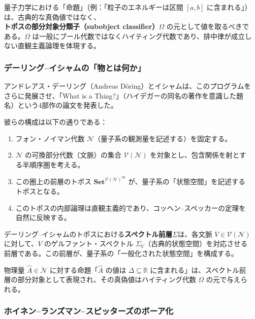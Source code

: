 \documentclass[12pt,a4paper]{ltjsarticle}
\theoremstyle{definition}
\newcommand{\Set}{\mathbf{Set}}
\begin{document}
\begin{keyinsight}
量子力学における「命題」（例：「粒子のエネルギーは区間 $[a,b]$ に含まれる」）は、古典的な真偽値ではなく、\textbf{トポスの部分対象分類子（subobject classifier）}$\Omega$ の元として値を取るべきである。$\Omega$ は一般にブール代数ではなくハイティング代数であり、排中律が成立しない直観主義論理を体現する。
\end{keyinsight}

\subsubsection{デーリング--イシャムの「物とは何か」}

アンドレアス・デーリング（Andreas Döring）とイシャムは、このプログラムをさらに発展させ、「What is a Thing?」\cite{DoeringIsham2008a, DoeringIsham2008b, DoeringIsham2008c, DoeringIsham2008d}（ハイデガーの同名の著作を意識した題名）という4部作の論文を発表した。

彼らの構成は以下の通りである：

\begin{enumerate}[leftmargin=2em]
  \item フォン・ノイマン代数 $\mathcal{N}$（量子系の観測量を記述する）を固定する。
  \item $\mathcal{N}$ の可換部分代数（文脈）の集合 $\mathcal{V}(\mathcal{N})$ を対象とし、包含関係を射とする半順序圏を考える。
  \item この圏上の前層のトポス $\Set^{\mathcal{V}(\mathcal{N})^{\mathrm{op}}}$ が、量子系の「状態空間」を記述するトポスとなる。
  \item このトポスの内部論理は直観主義的であり、コッヘン--スペッカーの定理を自然に反映する。
\end{enumerate}

デーリング--イシャムのトポスにおける\textbf{スペクトル前層}$\underline{\Sigma}$は、各文脈 $V \in \mathcal{V}(\mathcal{N})$ に対して、$V$ のゲルファント・スペクトル $\Sigma_V$（古典的状態空間）を対応させる前層である。この前層が、量子系の「一般化された状態空間」を構成する。

物理量 $\hat{A} \in \mathcal{N}$ に対する命題「$\hat{A}$ の値は $\Delta \subseteq \mathbb{R}$ に含まれる」は、スペクトル前層の部分対象として表現され、その真偽値はハイティング代数 $\Omega$ の元で与えられる。

\subsubsection{ホイネン--ランズマン--スピッターズのボーア化}
\end{document}
